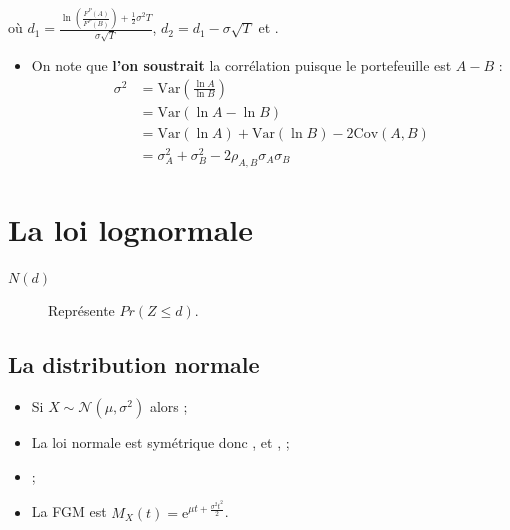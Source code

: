 \documentclass[10pt, french]{article}
\begin{document}
\begin{multicols*}{2}
où $d_{1}	=	\frac{\ln\left(\frac{F^{P}(A)}{F^{P}(B)}\right) + \frac{1}{2} \sigma^{2} T}{\sigma \sqrt{T}}$, $d_{2}	=	d_{1} - \sigma \sqrt{T}$ et .
\begin{itemize}
	\item	On note que \textbf{l'on soustrait} la corrélation puisque le portefeuille est $A	-	B$ : 
	\begin{align*}
	\sigma^{2}
	&=	\text{Var}\left(\frac{\ln A}{\ln B}\right)	\\
	&=	\text{Var}\left(\ln A	-	\ln B\right)	\\
	&=	\text{Var}(\ln A)	+	\text{Var}(\ln B)	-	2\text{Cov}(A, B)	\\
	&=	\sigma^{2}_{A}	+	\sigma^{2}_{B}	-	2\rho_{A, B} \sigma_{A} \sigma_{B}
	\end{align*}
\end{itemize}

\pagebreak
\setcounter{section}{17}
\section{La loi lognormale}
\label{sec:lognorm}
\begin{distributions}[Notation]
\begin{description}
	\item[$N(d)$]	Représente $Pr(Z \leq d)$.
\end{description}
\end{distributions}


\subsection{La distribution normale}
\begin{itemize}[leftmargin = *]
	\item	Si $X \sim \mathcal{N}(\mu, \sigma^{2})$ alors ;
	\item	La loi normale est symétrique donc ,  et , ;
	\item	{};
	\item	La FGM est $M_{X}(t)	=	\textrm{e}^{\mu t + \frac{\sigma^{2} t^{2}}{2}}$.
\end{itemize}



\end{multicols*}
\end{document}
